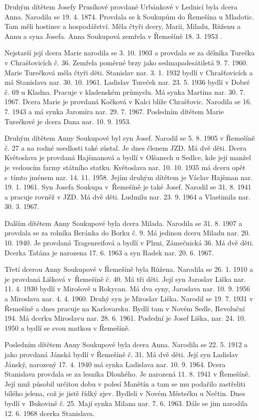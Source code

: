 \documentclass[../dejiny-rodu-prusiku.tex]{subfiles}
\begin{document}
Druhým dítětem Josefy Prusíkové provdané Urbánkové v Lednicí byla dcera Anna. Narodila se 19. 4. 1874. Provdala se k Soukupům do Řemešína u Mladotic. Tam měli hostinec a hospodářství. Měla čtyři dcery, Marii, Miladu, Růženu a Annu a syna Josefa. Anna Soukupová zemřela v Řemešíně 18. 3. 1953 .

Nejstarší její dcera Marie narodila se 3. 10. 1903 a provdala se za dělníka Turečka v Chrašťovicích č. 36. Zemřela poměrné brzy jako sedmapadesátiletá 9. 7. 1960. Marie Turečková měla čtyři děti. Stanislav nar. 3. 1. 1932 bydlí v Chrašťovicích a má Stanislava nar. 30. 10. 1961. Ladislav Tureček nar. 23. 5. 1936 bydlí v Dobré č. 69 u Kladna. Pracuje v kladenském průmyslu. Má synka Marti­na nar. 30. 7. 1967. Dcera Marie je provdaná Kočková v Kalci blíže Chrašťovic. Narodila se 16. 7. 1943 a má syn­ka Jaromíra nar. 29. 7. 1967. Posledním dítětem Marie Turečkové je dcera Dana nar. 10. 9. 1953.

Druhým dítětem Anny Soukupové byl syn Josef. Narodil se 5. 8. 1905 v Řemešíně č. 27 a na rodné usedlosti také zůstal. Je dnes členem JZD. Má dvě děti. Dcera Květo­slava je provdaná Hajšmanová a bydlí v Olšanech u Sedlce, kde její manžel je vedoucím farmy státního statku. Květoslava nar. 10. 10. 1935 má dceru opět s tímto jménem nar. 14. 11. 1958. Jejím druhým dítětem je Václav Hajšman nar. 19. 1. 1961. Syn Josefa Soukupa v Řemešíně je také Josef. Narodil se 31. 8. 1941 a pracuje rovněž v JZD. Má dvě děti. Ludmilu nar. 23. 9. 1964 a Vlastimila nar. 30. 3. 1967.

Dalším dítětem Anny Soukupové byla dcera Milada. Narodila se 31. 8. 1907 a provdala se za rolníka Beránka do Borku č. 9. Má jedinou dceru Miladu nar. 20. 10. 1940. Je provdaná Tragenreifová a bydlí v Plzni, Zámečnická 36. Má dvě děti. Dcerka Taťána je narozena 17. 6. 1963 a syn Radek nar. 20. 6. 1967.

Třetí dcerou Anny Soukupové v Řemešíně byla Růžena. Narodila se 26. 1. 1910 a je provdaná Lišková v Řemešíně č. 40. Má tři děti. Její syn Jaroslav Liška nar. 11. 4. 1930 bydlí v Mirošově u Rokycan. Má dva syny, Jarosla­va nar. 10. 9. 1956 a Miroslava nar. 4. 4. 1960. Druhý syn je Miroslav Liška. Narodil se 19. 7. 1931 v Řemešíně a dnes pracuje na Karlovarsku. Bydlí tam v Novém Sedle, Revoluční 194. Má dcerku Miroslavu nar. 28. 6. 1961. Poslední je Josef Liška, nar. 24. 10. 1950 a bydlí se svou matkou v Řemešíně.

Posledním dítětem Anny Soukupové byla dcera Anna. Narodila se 22. 5. 1912 a jako provdaná Jánská bydlí v Řemešíně č. 31. Má dvě děti. Její syn Ladislav Jánský, narozený 17. 4. 1940 má synka Ladislava nar. 10. 9. 1964. Dcera Stanislava provdala se za lesníka Dlouhého. Je narozená 11. 8. 1941 v Řemešíně. Její muž působil urči­tou dobu v polesí Manětín a tam se mu podařilo zastřeliti bílého jelena, což je jistě řídký zjev. Bydleli v Novém Městečku u Nečtin. Dnes bydlí v Bukovině č. 25. Mají synka Milana nar. 7. 6. 1963. Dále se jim narodila 12. 6. 1968 dcerka Stanislava.
\end{document}
